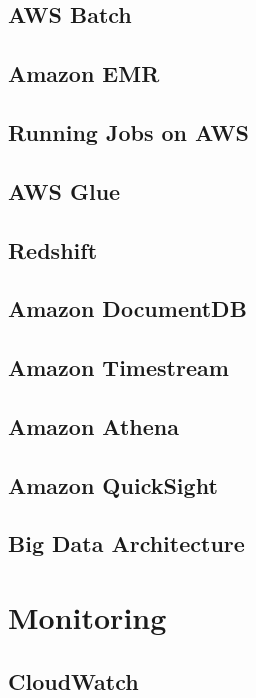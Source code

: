 \documentclass[11pt]{book}
\begin{document}
    \section{AWS Batch}


    \section{Amazon EMR}


    \section{Running Jobs on AWS}


    \section{AWS Glue}


    \section{Redshift}


    \section{Amazon DocumentDB}


    \section{Amazon Timestream}


    \section{Amazon Athena}


    \section{Amazon QuickSight}


    \section{Big Data Architecture}


    \chapter{Monitoring}


    \section{CloudWatch}
\end{document}
